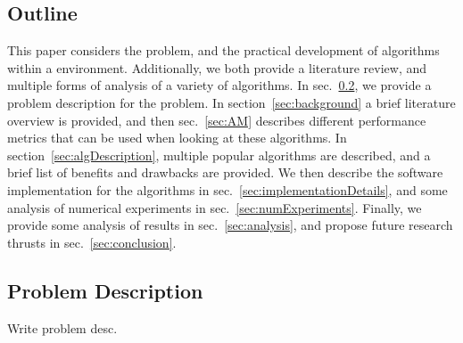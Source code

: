 \subsection{Outline}
\label{sec:out}
This paper considers the \KS problem, and the practical development of algorithms within a \CC environment. Additionally, we both provide a literature review, and multiple forms of analysis of a variety of algorithms. In sec.~\ref{sec:desc}, we provide a problem description for the \KS problem. In section~\ref{sec:background} a brief literature overview is provided, and then sec.~\ref{sec:AM} describes different performance metrics that can be used when looking at these algorithms. In section~\ref{sec:algDescription}, multiple popular \KS algorithms are described, and a brief list of benefits and drawbacks are provided. We then describe the software implementation for the algorithms in sec.~\ref{sec:implementationDetails}, and some analysis of numerical experiments in sec.~\ref{sec:numExperiments}. Finally, we provide some analysis of results in sec.~\ref{sec:analysis}, and propose future research thrusts in sec.~\ref{sec:conclusion}.

\subsection{Problem Description}
\label{sec:desc}
Write problem desc.
